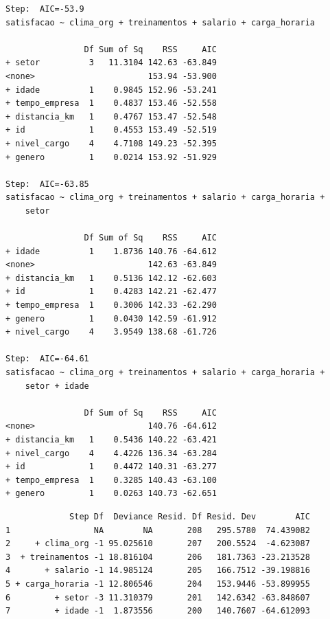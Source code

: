 \documentclass[
  letterpaper,
  DIV=11,
  numbers=noendperiod]{scrartcl}
\newenvironment{Shaded}{\begin{snugshade}}{\end{snugshade}}
\newcommand{\NormalTok}[1]{\textcolor[rgb]{0.00,0.23,0.31}{#1}}
\newcommand{\SpecialCharTok}[1]{\textcolor[rgb]{0.37,0.37,0.37}{#1}}
\begin{document}
\begin{verbatim}
Step:  AIC=-53.9
satisfacao ~ clima_org + treinamentos + salario + carga_horaria

                Df Sum of Sq    RSS     AIC
+ setor          3   11.3104 142.63 -63.849
<none>                       153.94 -53.900
+ idade          1    0.9845 152.96 -53.241
+ tempo_empresa  1    0.4837 153.46 -52.558
+ distancia_km   1    0.4767 153.47 -52.548
+ id             1    0.4553 153.49 -52.519
+ nivel_cargo    4    4.7108 149.23 -52.395
+ genero         1    0.0214 153.92 -51.929

Step:  AIC=-63.85
satisfacao ~ clima_org + treinamentos + salario + carga_horaria + 
    setor

                Df Sum of Sq    RSS     AIC
+ idade          1    1.8736 140.76 -64.612
<none>                       142.63 -63.849
+ distancia_km   1    0.5136 142.12 -62.603
+ id             1    0.4283 142.21 -62.477
+ tempo_empresa  1    0.3006 142.33 -62.290
+ genero         1    0.0430 142.59 -61.912
+ nivel_cargo    4    3.9549 138.68 -61.726

Step:  AIC=-64.61
satisfacao ~ clima_org + treinamentos + salario + carga_horaria + 
    setor + idade

                Df Sum of Sq    RSS     AIC
<none>                       140.76 -64.612
+ distancia_km   1    0.5436 140.22 -63.421
+ nivel_cargo    4    4.4226 136.34 -63.284
+ id             1    0.4472 140.31 -63.277
+ tempo_empresa  1    0.3285 140.43 -63.100
+ genero         1    0.0263 140.73 -62.651
\end{verbatim}

\begin{Shaded}
\end{Shaded}

\begin{verbatim}
             Step Df  Deviance Resid. Df Resid. Dev        AIC
1                 NA        NA       208   295.5780  74.439082
2     + clima_org -1 95.025610       207   200.5524  -4.623087
3  + treinamentos -1 18.816104       206   181.7363 -23.213528
4       + salario -1 14.985124       205   166.7512 -39.198816
5 + carga_horaria -1 12.806546       204   153.9446 -53.899955
6         + setor -3 11.310379       201   142.6342 -63.848607
7         + idade -1  1.873556       200   140.7607 -64.612093
\end{verbatim}
\end{document}
